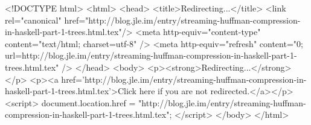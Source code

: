 <!DOCTYPE html>
<html>
<head>
<title>Redirecting...</title>
<link rel="canonical" href="http://blog.jle.im/entry/streaming-huffman-compression-in-haskell-part-1-trees.html.tex"/>
<meta http-equiv="content-type" content="text/html; charset=utf-8" />
<meta http-equiv="refresh" content="0; url=http://blog.jle.im/entry/streaming-huffman-compression-in-haskell-part-1-trees.html.tex" />
</head>
<body>
  <p><strong>Redirecting...</strong></p>
  <p><a href='http://blog.jle.im/entry/streaming-huffman-compression-in-haskell-part-1-trees.html.tex'>Click here if you are not redirected.</a></p>
  <script>
    document.location.href = "http://blog.jle.im/entry/streaming-huffman-compression-in-haskell-part-1-trees.html.tex";
  </script>
</body>
</html>
